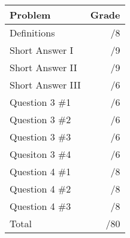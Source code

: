 \documentclass[12pt]{article}
\newcommand{\skipline}{\vspace{12pt}}
\begin{document}
\begin{table}[hbt]
\begin{center}
\begin{tabular}{|l|r|} \hline
Problem&Grade\\
\hline \hline
\cline{1-2} Definitions & \enspace\enspace\enspace\enspace\enspace\enspace/8\\
\cline{1-2} Short Answer I & \enspace\enspace\enspace\enspace\enspace\enspace/9\\
\cline{1-2} Short Answer II & \enspace\enspace\enspace\enspace\enspace\enspace/9\\
\cline{1-2} Short Answer III & \enspace\enspace\enspace\enspace\enspace\enspace/6\\
\cline{1-2} Question 3 \#1 & \enspace\enspace\enspace\enspace\enspace\enspace/6\\
\cline{1-2} Question 3 \#2 & \enspace\enspace\enspace\enspace\enspace\enspace/6\\
\cline{1-2} Question 3 \#3 & \enspace\enspace\enspace\enspace\enspace\enspace/6\\
\cline{1-2} Quesiton 3 \#4 & \enspace\enspace\enspace\enspace\enspace\enspace/6\\
\cline{1-2} Question 4 \#1 & \enspace\enspace\enspace\enspace\enspace\enspace/8\\
\cline{1-2} Question 4 \#2 & \enspace\enspace\enspace\enspace\enspace\enspace/8\\
\cline{1-2} Question 4 \#3 & \enspace\enspace\enspace\enspace\enspace\enspace/8\\
\cline{1-2} Total & \enspace\enspace\enspace\enspace\enspace\enspace/80\\
\hline
\end{tabular}

\skipline

\skipline

\skipline

\end{center}
\end{table}
\newpage
\end{document}
